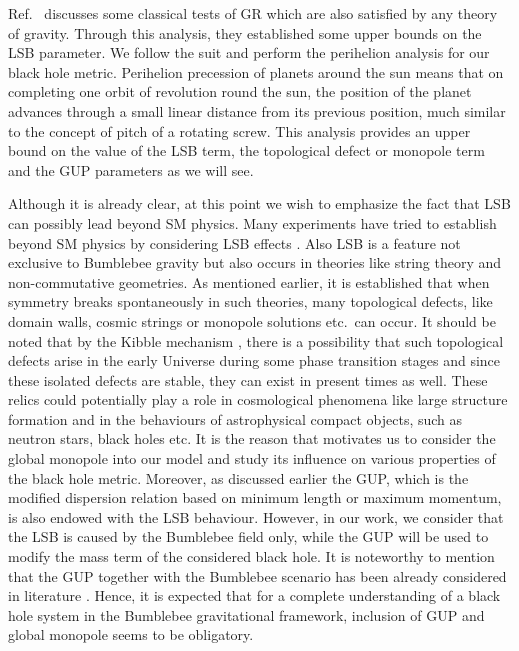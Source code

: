 \documentclass[aps,amsmath,amssymb,showpacs,showkeys]{revtex4}
\begin{document}
Ref.~\cite{17} discusses some classical tests of GR which are also satisfied 
by any theory of gravity. Through this analysis, they established some upper 
bounds on the LSB parameter. We follow the suit and perform the perihelion 
analysis for our black hole metric. Perihelion precession of planets around 
the sun means that on completing one orbit of revolution round the sun, the 
position of the planet advances through a small linear distance from its 
previous position, much similar to the concept of pitch of a rotating screw. 
This analysis provides an upper bound on the value of the LSB term, the 
topological defect or monopole term and the GUP parameters as we will see.

 Although it is already clear, at this point we wish to emphasize the fact
that LSB can possibly lead beyond SM physics. Many experiments 
have tried to establish beyond SM physics by considering LSB effects 
\cite{ref1,ref2}. Also LSB is a feature not exclusive to Bumblebee gravity but 
also occurs in theories like string theory and non-commutative geometries. 
As mentioned earlier, it is established that when symmetry breaks spontaneously 
in such theories, many topological defects, like domain walls, cosmic strings 
or monopole solutions etc.\ can occur. It should be noted that by the Kibble 
mechanism \cite{ref3}, there is a possibility that such topological defects 
arise in the early Universe during some phase transition stages and since 
these isolated defects are stable, they can exist in present times as well. 
These relics could potentially play a role in cosmological phenomena like 
large structure formation and in the  behaviours of astrophysical compact 
objects, such as neutron stars, black holes etc. It is the reason that 
motivates us to consider the global monopole into our model and study its 
influence on various properties of the black hole metric. Moreover, as 
discussed earlier the GUP, which is the modified dispersion relation based on 
minimum length or maximum momentum, is also endowed with the LSB behaviour. 
However, in our work, we consider that the LSB is caused by the Bumblebee 
field only, while the GUP will be used to modify the mass term of the 
considered black hole. 
It is noteworthy to mention that the GUP together with the Bumblebee scenario 
has been already considered in literature \cite{ref4}. Hence, it is expected 
that for a complete understanding of a black hole system in the Bumblebee 
gravitational framework, inclusion of GUP and global monopole seems to be 
obligatory.
\end{document}
